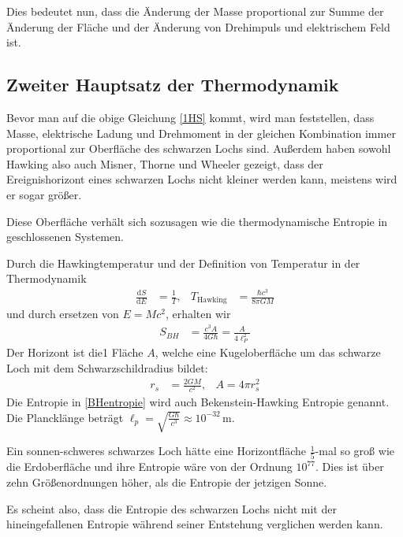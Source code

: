 \documentclass[ngerman]{scrartcl}
\newcommand{\diff}{\mathrm{d}}
\begin{document}
	Dies bedeutet nun, dass die Änderung der Masse proportional zur Summe der Änderung der Fläche und der Änderung von Drehimpuls und elektrischem Feld ist.

\subsection{Zweiter Hauptsatz der Thermodynamik} \label{zweiterHS}
	Bevor man auf die obige Gleichung \ref{1HS} kommt, wird man feststellen, dass Masse, elektrische Ladung und Drehmoment in der gleichen Kombination immer proportional zur Oberfläche des schwarzen Lochs sind. 
	Außerdem haben sowohl Hawking \cite{ParticleCreation} also auch Misner, Thorne und Wheeler \cite{MisnerThorneWheeler} gezeigt, dass der Ereignishorizont eines schwarzen Lochs nicht kleiner werden kann, meistens wird er sogar größer. 
	
	Diese Oberfläche verhält sich sozusagen wie die thermodynamische Entropie in geschlossenen Systemen. 
	
	Durch die Hawkingtemperatur und der Definition von Temperatur in der Thermodynamik
	\begin{align} \label{HawkingTemp}
	\frac{\diff S}{\diff E} &= \frac{1}{T},&
	T_{\text{Hawking}} &= \frac{\hbar c^3}{8 \pi G M}
	\end{align}
	und durch ersetzen von $E = Mc^2$, erhalten wir
	\begin{align} \label{BHentropie}
	S_{BH} &= \frac{c^3 A}{4 G \hbar} = \frac{A}{4 \ell_P^2} 
	\end{align}
	Der Horizont ist die1 Fläche $A$, welche eine Kugeloberfläche um das schwarze Loch mit dem Schwarzschildradius bildet:
	\begin{align} \label{OberflaecheSH}
	r_s &= \frac{2 GM}{c^2} ,& A = 4 \pi r_s^2 
	\end{align}
	Die Entropie in \eqref{BHentropie} wird auch Bekenstein-Hawking Entropie genannt. Die Plancklänge beträgt $\ell_p = \sqrt{\frac{G \hbar}{c^3}} \approx 10^{-32}\,$m.
	
	Ein sonnen-schweres schwarzes Loch hätte eine Horizontfläche $\frac{1}{5}$-mal so groß wie die Erdoberfläche und ihre Entropie wäre von der Ordnung $10^{77}$. Dies ist über zehn Größenordnungen höher, als die Entropie der jetzigen Sonne.  
	
	Es scheint also, dass die Entropie des schwarzen Lochs nicht mit der hineingefallenen Entropie während seiner Entstehung verglichen werden kann.
	
\end{document}
